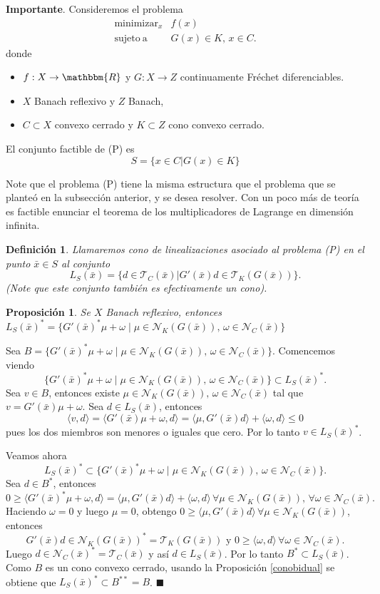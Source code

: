 \documentclass[a4paper,10pt]{book}
\newcommand{\R}{\mathbbm{R}}
\newcommand{\arr}{\rightarrow}
\newcommand{\bx}{\bar{x}}
\newcommand{\cN}{\mathcal{N}}
\newcommand{\cT}{\mathcal{T}}
\newcommand{\la}{\langle}
\newcommand{\ra}{\rangle}
\newtheorem{prop}[teo]{Proposici\'on}
\newtheorem{defi}[teo]{Definici\'on}
\newenvironment{dem}{\vspace*{-0.1cm}{\it Demostraci\'on:}}{\hfill
$\blacksquare$\\}
\begin{document}
\textbf{Importante}.
Consideremos el problema
\[\tag{P}
\begin{array}{rl}
\displaystyle \mathop{\mathrm{minimizar}}_{x} & \displaystyle f(x) \\
\mathrm{sujeto \ a} & G(x)\in K,\, x\in C.
\end{array}
\]
donde
\begin{itemize}
\item$f:X\arr\R$ y $G:X\arr Z$ continuamente Fréchet diferenciables.

\item $X$ Banach reflexivo y $Z$ Banach,

\item $C\subset X$ convexo cerrado y $K\subset Z$ cono convexo cerrado.
\end{itemize}


El conjunto factible de (P) es $$S=\{x\in C | G(x)\in K\}$$

Note que el problema (P) tiene la misma estructura que el problema que se planteó en la subsección anterior, y se desea resolver. Con un poco más de teoría es factible enunciar el teorema de los multiplicadores de Lagrange en dimensión infinita.

\begin{defi}
 Llamaremos cono de linealizaciones asociado al problema (P) en el punto $\bx \in S$ al conjunto $$L_S(\bx)=\{d\in\cT_C(\bx) | G'(\bx)d\in \cT_K(G(\bx))\}.$$
 (Note que este conjunto también es efectivamente un cono).
\end{defi} 

\begin{prop}
Se $X$ Banach reflexivo, entonces $L_S(\bx)^* = \{G'(\bx)^*\mu + \omega\mid\mu\in\cN_K(G(\bx)),\, \omega\in\cN_C(\bx)\}$
\end{prop} 
\begin{dem}
Sea $B=\{G'(\bx)^*\mu+\omega\mid\mu\in\cN_K(G(\bx)),\,\omega\in \cN_C(\bx)\}$. Comencemos viendo $$\{G'(\bx)^*\mu + \omega\mid\mu\in\cN_K(G(\bx)),\, \omega\in\cN_C(\bx)\}\subset L_S(\bx)^*.$$ Sea $v\in B$, entonces existe $\mu\in\cN_K(G(\bx)),\,\omega\in\cN_C(\bx)$ tal que $v=G'(\bx)\mu+\omega.$ Sea $d\in L_S(\bx)$, entonces $$\la v,d\ra=\la G'(\bx)\mu+\omega,d\ra=\la \mu,G'(\bx)d\ra+\la\omega,d\ra\leq0$$ pues los dos miembros son menores o iguales que cero. Por lo tanto $v\in L_S(\bx)^*$.

Veamos ahora $$L_S(\bx)^* \subset \{G'(\bx)^*\mu + \omega\mid\mu\in\cN_K(G(\bx)),\, \omega\in\cN_C(\bx)\}.$$ Sea $d\in B^*$, entonces $$0\geq\la G'(\bx)^*\mu+\omega,d\ra=\la\mu,G'(\bx)d\ra+\la\omega,d\ra\,\forall\mu\in\cN_K(G(\bx)),\,\forall \omega\in\cN_C(\bx).$$ Haciendo $\omega=0$ y luego $\mu=0$, obtengo $0\geq\la\mu,G'(\bx)d\ra\,\forall\mu\in\cN_K(G(\bx))$, entonces $$G'(\bx)d\in\cN_K(G(\bx))^*=\cT_K(G(\bx))\mbox{ y }0\geq\la\omega,d\ra\,\forall\omega\in\cN_C(\bx).$$ Luego $d\in\cN_C(\bx)^*=\cT_C(\bx)$ y así $d\in L_S(\bx)$. Por lo tanto $B^*\subset L_S(\bx)$. Como $B$ es un cono convexo cerrado, usando la Proposición \ref{conobidual} se obtiene que $L_S(\bx)^*\subset B^{**}=B$.
\end{dem}
\end{document}
